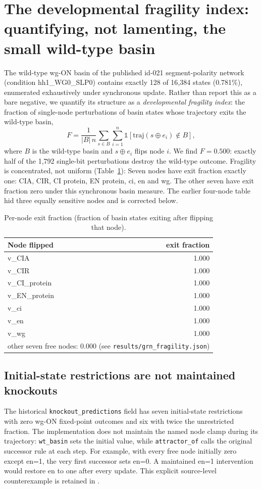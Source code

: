 \section{The developmental fragility index: quantifying, not lamenting, the small wild-type basin}
The wild-type wg-ON basin of the published id-021 segment-polarity network (condition hh1\_WG0\_SLP0) contains exactly 128 of 16{,}384 states (0.781\%), enumerated exhaustively under synchronous update. Rather than report this as a bare negative, we quantify its structure as a \emph{developmental fragility index}: the fraction of single-node perturbations of basin states whose trajectory exits the wild-type basin,
\begin{equation}
F = \frac{1}{|B|\,n}\sum_{s \in B}\sum_{i=1}^{n} \mathbb{1}\left[\mathrm{traj}(s \oplus e_i) \notin B\right],
\end{equation}
where $B$ is the wild-type basin and $s \oplus e_i$ flips node $i$. We find $F = 0.500$: exactly half of the 1{,}792 single-bit perturbations destroy the wild-type outcome. Fragility is concentrated, not uniform (Table~\ref{tab:fragility}): Seven nodes have exit fraction exactly one: CIA, CIR, CI protein, EN protein, ci, en and wg. The other seven have exit fraction zero under this synchronous basin measure. The earlier four-node table hid three equally sensitive nodes and is corrected below.
\begin{table}[!htbp]\centering\small
\caption{Per-node exit fraction (fraction of basin states exiting after flipping that node).}\label{tab:fragility}
\begin{tabular}{lr}\hline\hline
Node flipped & exit fraction \\ \hline
v\_CIA & 1.000 \\
v\_CIR & 1.000 \\
v\_CI\_protein & 1.000 \\
v\_EN\_protein & 1.000 \\
v\_ci & 1.000 \\
v\_en & 1.000 \\
v\_wg & 1.000 \\
\multicolumn{2}{l}{other seven free nodes: 0.000 (see \texttt{results/grn\_fragility.json})}\\
\hline\hline\end{tabular}
\end{table}

\subsection{Initial-state restrictions are not maintained knockouts}
The historical \texttt{knockout\_predictions} field has seven initial-state restrictions with zero wg-ON fixed-point outcomes and six with twice the unrestricted fraction. The implementation does not maintain the named node clamp during its trajectory: \texttt{wt\_basin} sets the initial value, while \texttt{attractor\_of} calls the original successor rule at each step. For example, with every free node initially zero except en=1, the very first successor sets en=0. A maintained en=1 intervention would restore en to one after every update. This explicit source-level counterexample is retained in .

